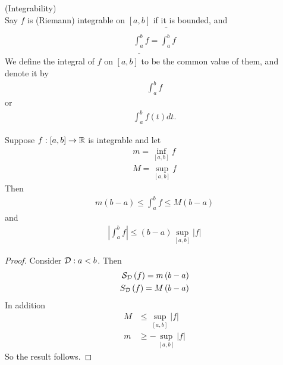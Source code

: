 \documentclass[a4paper]{article}
\begin{document}
\begin{defi} (Integrability)\\
Say $f$ is (Riemann) integrable on $\left[a,b\right]$ if it is bounded, and
\begin{equation*}
\begin{aligned}
\underline{\int_a^b} f = \bar{\int_a^b} f
\end{aligned}
\end{equation*}
We define the integral of $f$ on $\left[a,b\right]$ to be the common value of them, and denote it by
\begin{equation*}
\begin{aligned}
\int_a^b f
\end{aligned}
\end{equation*}
or
\begin{equation*}
\begin{aligned}
\int_a^b f\left(t\right) dt.
\end{aligned}
\end{equation*}
\end{defi}

\begin{prop}
Suppose $f:\left[a,b\right]\to\mathbb{R}$ is integrable and let
\begin{equation*}
\begin{aligned}
m=\inf_{\left[a,b\right]} f\\
M=\sup_{\left[a,b\right]} f
\end{aligned}
\end{equation*}
Then
\begin{equation*}
\begin{aligned}
m\left(b-a\right) \leq \int_a^b f \leq M\left(b-a\right)
\end{aligned}
\end{equation*}
and
\begin{equation*}
\begin{aligned}
|\int_a^b f| \leq \left(b-a\right) \sup_{\left[a,b\right]} |f|
\end{aligned}
\end{equation*}
\begin{proof}
Consider $\mathcal{D}:a<b$. Then
\begin{equation*}
\begin{aligned}
\mathcal{S}_{\mathcal{D}} \left(f\right) = m\left(b-a\right)\\
S_{\mathcal{D}}\left(f\right) = M\left(b-a\right)
\end{aligned}
\end{equation*}
In addition
\begin{equation*}
\begin{aligned}
M&\leq \sup_{\left[a,b\right]} |f|\\
m&\geq -\sup_{\left[a,b\right]} |f|
\end{aligned}
\end{equation*}
So the result follows.
\end{proof}
\end{prop}
\end{document}
